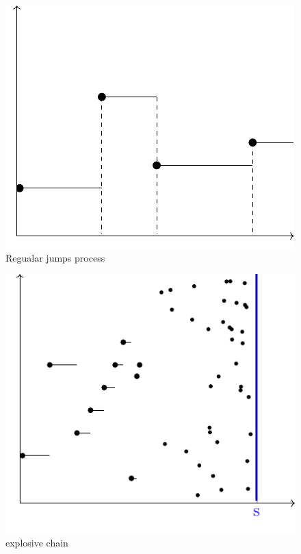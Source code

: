\documentclass{article}
\begin{document}
    \begin{minipage}{0.5\textwidth}
    \begin{figure}[H]
    \centering
    \includegraphics[scale=0.6]{standalones/pdfs/regjump}
    \caption{Regualar jumps process}
    \label{regjump}
\end{figure}
    \end{minipage} \hfill
    \begin{minipage}{0.45\textwidth}
    \begin{figure}[H]
    \centering
    \includegraphics[scale=0.6]{standalones/pdfs/xplosive}
    \caption{explosive chain}
    \label{xplchain}
\end{figure}
    \end{minipage}
\end{document}
